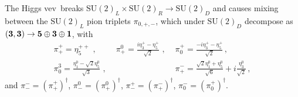 \documentclass[preprintnumbers,nofootinbib,showpacs,eqsecnum,pre,12pt]{revtex4-1}
\newcommand{\SU}{\text{SU}}
\newcommand{\vev}{vev}
\begin{document}
The Higgs \vev\ breaks $\SU(2)_L\times \SU(2)_R \rightarrow \SU(2)_D$ and causes mixing between the $\SU(2)_L$ pion triplets $\pi_{0,+,-}$, which under $\SU(2)_D$ decompose as $\left(\bf{3},\bf{3}\right)\rightarrow \bf{5}\oplus\bf{3}\oplus \bf{1}$, with
\begin{eqnarray}
\pi^+_+=\eta_5^{++}  \,\, ,& \,\, \pi^0_+=\displaystyle\frac{i\eta_3^+-\eta_5^{+}}{\sqrt{2}} \,\, ,& \,\, \pi^+_0=\frac{-i\eta_3^+-\eta_5^{+}}{\sqrt{2}}\, , \\
\pi_0^3 =\frac{\eta_1^0-\sqrt{2}\eta_5^{0}}{\sqrt{3}} \,\, ,& &\,\,
\pi_+^- =\frac{\sqrt{2}\eta_1^0+\eta_5^{0}}{\sqrt{6}} +i\frac{\eta_3^0}{\sqrt{2}}\, ,
\end{eqnarray}
and $\pi_-^-=(\pi_+^+)^\dagger$, $\pi_-^0=(\pi_+^0)^\dagger$,  $\pi_-^+=(\pi_+^-)^\dagger$, $\pi_0^-=(\pi_0^+)^\dagger$.
\end{document}
